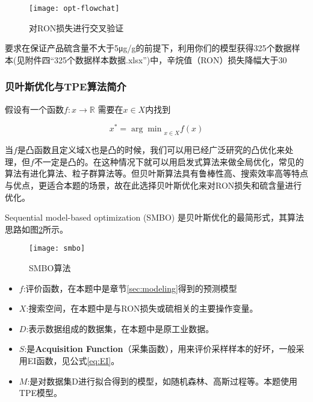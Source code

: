 \documentclass[bwprint]{gmcmthesis}
\begin{document}
\begin{figure}[htb]
	\centering
	\texttt{[image: opt-flowchat]}
	\caption{对RON损失进行交叉验证}
	\label{img:opt-flowchat}
\end{figure}


要求在保证产品硫含量不大于5μg/g的前提下，利用你们的模型获得325个数据样本(见附件四“325个数据样本数据.xlsx”)中，辛烷值（RON）损失降幅大于30%


\FloatBarrier
\subsubsection{贝叶斯优化与TPE算法简介}

假设有一个函数$f:x\rightarrow \mathbb{R}$ 需要在$x\in X$内找到

\begin{equation}\label{eq:optimation}
	x^*={\arg\min}_{x\in X}f(x)
\end{equation}

当$f$是凸函数且定义域X也是凸的时候，我们可以用已经广泛研究的凸优化来处理，但$f$不一定是凸的。在这种情况下就可以用启发式算法来做全局优化，常见的算法有进化算法、粒子群算法等。但贝叶斯算法具有鲁棒性高、搜索效率高等特点与优点，更适合本题的场景，故在此选择贝叶斯优化来对RON损失和硫含量进行优化。

Sequential model-based optimization (SMBO) 是贝叶斯优化的最简形式，其算法思路如图\ref{img:smbo}所示。

\begin{figure}[htb]
	\centering
	\texttt{[image: smbo]}
	\caption{SMBO算法}
	\label{img:smbo}
\end{figure}

\begin{itemize}
	\item $f$:评价函数，在本题中是章节\ref{sec:modeling}得到的预测模型
	\item $X$:搜索空间，在本题中是与RON损失或硫相关的主要操作变量。
	\item $D$:表示数据组成的数据集，在本题中是原工业数据。
	\item $S$:是\textbf{Acquisition Function}（采集函数），用来评价采样样本的好坏，一般采用EI函数，见公式\eqref{eq:EI}。
	\item $\mathit{M}$:是对数据集D进行拟合得到的模型，如随机森林、高斯过程等。本题使用TPE模型。
\end{itemize}
\end{document}
